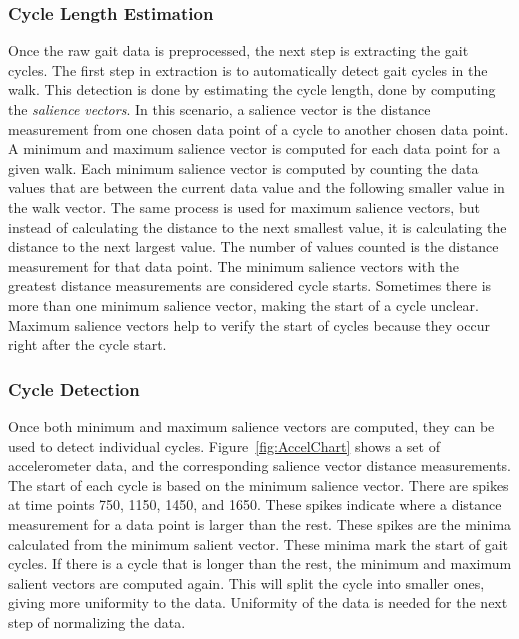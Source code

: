 \documentclass{sig-alternate}
\begin{document}
\subsubsection{Cycle Length Estimation}
	Once the raw gait data is preprocessed, the next step is extracting the gait cycles. The first step in extraction is to automatically detect gait cycles in the walk. This detection is done by estimating the cycle length, done by computing the \textit{salience vectors}. In this scenario, a salience vector is the distance measurement from one chosen data point of a cycle to another chosen data point. A minimum and maximum salience vector is computed for each data point for a given walk. Each minimum salience vector is computed by counting the data values that are between the current data value and the following smaller value in the walk vector. The same process is used for maximum salience vectors, but instead of calculating the distance to the next smallest value, it is calculating the distance to the next largest value. The number of values counted is the distance measurement for that data point. The minimum salience vectors with the greatest distance measurements are considered cycle starts. Sometimes there is more than one minimum salience vector, making the start of a cycle unclear. Maximum salience vectors help to verify the start of cycles because they occur right after the cycle start.
			
\subsubsection{Cycle Detection}
	Once both minimum and maximum salience vectors are computed, they can be used to detect individual cycles. Figure~\ref{fig:AccelChart} shows a set of accelerometer data, and the corresponding salience vector distance measurements. The start of each cycle is based on the minimum salience vector. There are spikes at time points 750, 1150, 1450, and 1650. These spikes indicate where a distance measurement for a data point is larger than the rest. These spikes are the minima calculated from the minimum salient vector. These minima mark the start of gait cycles. If there is a cycle that is longer than the rest, the minimum and maximum salient vectors are computed again. This will split the cycle into smaller ones, giving more uniformity to the data. Uniformity of the data is needed for the next step of normalizing the data.

\begin{figure*}
\centering
{}
\caption{Minimum Salient Vectors}
\label{fig:AccelChart}
\end{figure*}
\end{document}
